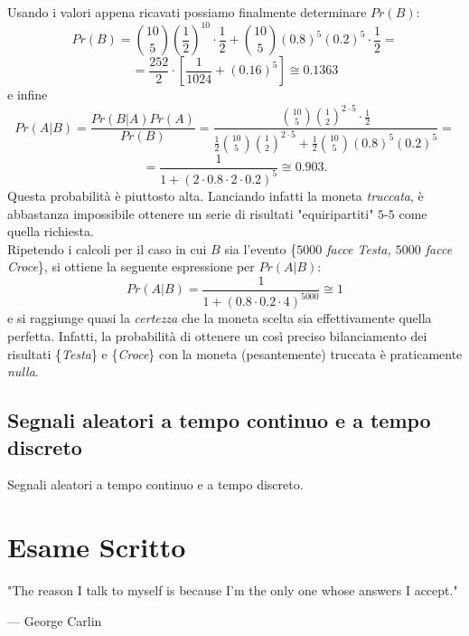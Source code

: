 \documentclass[12pt,oneside,openany]{memoir}
\numberwithin{equation}{subsection}
\begin{document}
Usando i valori appena ricavati possiamo finalmente determinare $Pr(B)$:
\[
    Pr(B) = {10 \choose 5} \left(\frac{1}{2}\right)^10 \cdot \frac{1}{2} +
    {10 \choose 5} (0.8)^5 (0.2)^5 \cdot \frac{1}{2} =
\]
\[
    = \frac{252}{2} \cdot \left[\frac{1}{1024} + (0.16)^5\right] \cong 0.1363
\]
e infine
\[
    Pr(A|B) = \frac{Pr(B|A) Pr(A)}{Pr(B)} = \frac{{10 \choose 5} {1 \choose 2}
    ^{2 \cdot 5} \cdot \frac{1}{2}}{\frac{1}{2} {10 \choose 5} {1 \choose 2}
    ^{2 \cdot 5} + \frac{1}{2} {10 \choose 5} (0.8)^5 (0.2)^5} =
\]
\[
    = \frac{1}{1 + (2 \cdot 0.8 \cdot 2 \cdot 0.2)^5} \cong 0.903.
\]
Questa probabilit\`a \`e piuttosto alta. Lanciando infatti la moneta
\textit{truccata}, \`e abbastanza impossibile ottenere un serie di risultati
"equiripartiti" $5$-$5$ come quella richiesta.\\
Ripetendo i calcoli per il caso in cui $B$ sia l'evento \{\textit{$5000$ facce
Testa, $5000$ facce Croce}\}, si ottiene la seguente espressione per $Pr(A|B)$:
\[
    Pr(A|B) = \frac{1}{1 + (0.8 \cdot 0.2 \cdot 4)^{5000}} \cong 1
\]
e si raggiunge quasi la \textit{certezza} che la moneta scelta sia
effettivamente quella perfetta. Infatti, la probabilit\`a di ottenere un cos\`i
preciso bilanciamento dei risultati \{\textit{Testa}\} e \{\textit{Croce}\} con
la moneta (pesantemente) truccata  \`e praticamente \textit{nulla}.


\newpage
\section{Segnali aleatori a tempo continuo e a tempo discreto}
Segnali aleatori a tempo continuo e a tempo discreto.


\chapter{Esame Scritto}
\epigraph{
	"The reason I talk to myself is because I'm the only one whose answers I
	accept."
}{--- \textup{George Carlin}}
\end{document}
